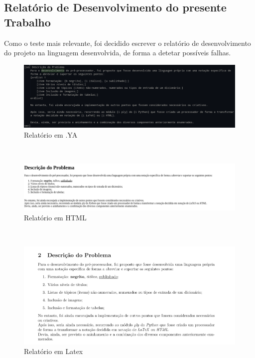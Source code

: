 \documentclass{article}
\begin{document}
 \subsection{Relatório de Desenvolvimento do presente Trabalho}
Como o teste mais relevante, foi decidido escrever o relatório de desenvolvimento do projeto na linguagem desenvolvida, de forma a detetar possíveis falhas.\\
 
\begin{figure}[!ht]
\centering
\includegraphics[width=\textwidth]{images/relatorioYA.png}
\caption{Relatório em .YA}
\end{figure}
\\
 
\begin{figure}[!ht]
\centering
\includegraphics[width=\textwidth]{images/relatorioHTML.png}
\caption{Relatório em HTML}
\end{figure}
\\
 
\begin{figure}[!ht]
\centering
\includegraphics[width=\textwidth]{images/relatorioTEX.png}
\caption{Relatório em Latex}
\end{figure}
 \clearpage
\end{document}
